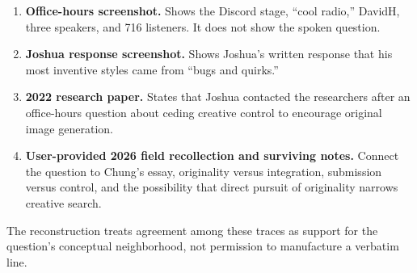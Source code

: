 \documentclass[
]{article}
\providecommand{\tightlist}{%
  \setlength{\itemsep}{0pt}\setlength{\parskip}{0pt}}
\begin{document}
\begin{enumerate}
\def\labelenumi{\arabic{enumi}.}
\tightlist
\item
  \textbf{Office-hours screenshot.} Shows the Discord stage, ``cool
  radio,'' DavidH, three speakers, and 716 listeners. It does not show
  the spoken question.
\item
  \textbf{Joshua response screenshot.} Shows Joshua's written response
  that his most inventive styles came from ``bugs and quirks.''
\item
  \textbf{2022 research paper.} States that Joshua contacted the
  researchers after an office-hours question about ceding creative
  control to encourage original image generation.
\item
  \textbf{User-provided 2026 field recollection and surviving notes.}
  Connect the question to Chung's essay, originality versus integration,
  submission versus control, and the possibility that direct pursuit of
  originality narrows creative search.
\end{enumerate}

The reconstruction treats agreement among these traces as support for
the question's conceptual neighborhood, not permission to manufacture a
verbatim line.
\end{document}
